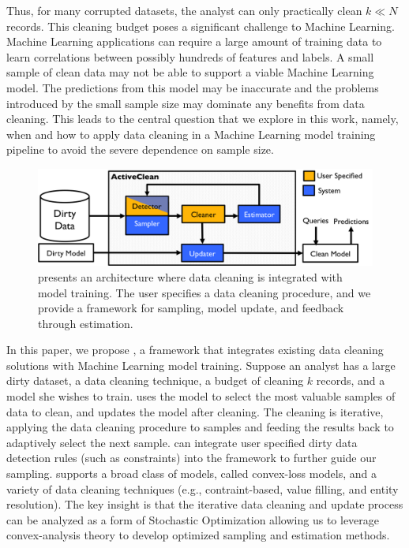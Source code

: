 Thus, for many corrupted datasets, the analyst can only practically clean $k \ll N$ records.
This cleaning budget poses a significant challenge to Machine Learning.
Machine Learning applications can require a large amount of training data to learn correlations between possibly hundreds of features and labels.
A small sample of clean data may not be able to support a viable Machine Learning model.
The predictions from this model may be inaccurate and the problems introduced by the small sample size may dominate any benefits from data cleaning. 
This leads to the central question that we explore in this work, namely, when and how to apply data cleaning in a Machine Learning model training pipeline to avoid the severe dependence on sample size.

\begin{figure}[t]
\centering
 \includegraphics[width=\columnwidth]{figs/arch.png}
 \caption{\sysfull presents an architecture where data cleaning is integrated with model training. The user specifies a data cleaning procedure, and we provide a framework for sampling, model update, and feedback through estimation. \label{sys-arch}}\vspace{-2em}
\end{figure}

In this paper, we propose \sys, a framework that integrates existing data cleaning solutions with Machine Learning model training.
Suppose an analyst has a large dirty dataset, a data cleaning technique, a budget of cleaning $k$ records, and a model she wishes to train.
\sys uses the model to select the most valuable samples of data to clean, and updates the model after cleaning.
The cleaning is iterative, applying the data cleaning procedure to samples and feeding the results back to adaptively select the next sample. 
\sys can integrate user specified dirty data detection rules (such as constraints) into the framework to further guide our sampling.
\sys supports a broad class of models, called convex-loss models, and a variety of data cleaning techniques (e.g., contraint-based, value filling, and entity resolution).
The key insight is that the iterative data cleaning and update process can be analyzed as a form of Stochastic Optimization \cite{bertsekas2011incremental} allowing us to leverage convex-analysis theory to develop optimized sampling and estimation methods.


